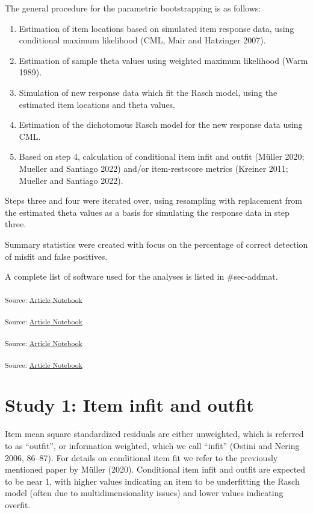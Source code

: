 \documentclass[
  letterpaper,
  DIV=11,
  numbers=noendperiod]{scrartcl}
\providecommand{\tightlist}{%
  \setlength{\itemsep}{0pt}\setlength{\parskip}{0pt}}\usepackage{longtable,booktabs,array}
\begin{document}
The general procedure for the parametric bootstrapping is as follows:

\begin{enumerate}
\def\labelenumi{\arabic{enumi}.}
\tightlist
\item
  Estimation of item locations based on simulated item response data,
  using conditional maximum likelihood (CML, Mair and Hatzinger 2007).
\item
  Estimation of sample theta values using weighted maximum likelihood
  (Warm 1989).
\item
  Simulation of new response data which fit the Rasch model, using the
  estimated item locations and theta values.
\item
  Estimation of the dichotomous Rasch model for the new response data
  using CML.
\item
  Based on step 4, calculation of conditional item infit and outfit
  (Müller 2020; Mueller and Santiago 2022) and/or item-restscore metrics
  (Kreiner 2011; Mueller and Santiago 2022).
\end{enumerate}

Steps three and four were iterated over, using resampling with
replacement from the estimated theta values as a basis for simulating
the response data in step three.

Summary statistics were created with focus on the percentage of correct
detection of misfit and false positives.

A complete list of software used for the analyses is listed in
\#sec-addmat.

\textsubscript{Source:
\href{https://pgmj.github.io/rasch_itemfit/index.qmd.html}{Article
Notebook}}

\textsubscript{Source:
\href{https://pgmj.github.io/rasch_itemfit/index.qmd.html}{Article
Notebook}}

\textsubscript{Source:
\href{https://pgmj.github.io/rasch_itemfit/index.qmd.html}{Article
Notebook}}

\textsubscript{Source:
\href{https://pgmj.github.io/rasch_itemfit/index.qmd.html}{Article
Notebook}}

\section{Study 1: Item infit and
outfit}\label{study-1-item-infit-and-outfit}

Item mean square standardized residuals are either unweighted, which is
referred to as ``outfit'', or information weighted, which we call
``infit'' (Ostini and Nering 2006, 86--87). For details on conditional
item fit we refer to the previously mentioned paper by Müller (2020).
Conditional item infit and outfit are expected to be near 1, with higher
values indicating an item to be underfitting the Rasch model (often due
to multidimensionality issues) and lower values indicating overfit.
\end{document}

